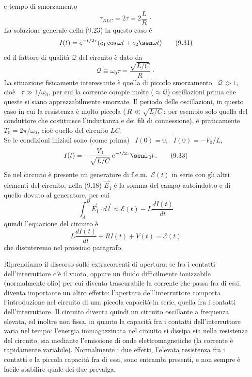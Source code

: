 e tempo di smorzamento
\begin{equation}
  \tau_{\scriptscriptstyle RLC}=2\tau=2\frac{L}{R}\,\cdot
  \tag{9.30}
\end{equation}
La soluzione generale della (9.23) in questo caso \`e
\begin{equation}
  I(t)=e^{-t/2\tau}(c_1\cos\omega t+c_2\sen\omega t)
  \tag{9.31}
\end{equation}
ed il fattore di qualit\`a $\mathcal Q$ del circuito \`e dato da
\begin{equation}
  \mathcal Q\equiv\omega_0\tau=\frac{\sqrt{L/C}}{R}\,\cdot
  \tag{9.32}
\end{equation}
La situazione fisicamente interessante \`e quella di piccolo smorzamento
\ $\mathcal Q\gg1$, cio\`e \ $\tau\gg1/\omega_0$, per cui la corrente compie
molte ($\approx\mathcal Q$) oscillazioni prima che queste si siano
apprezzabilmente smorzate. Il periodo delle oscillazioni, in questo caso in cui
la resistenza \`e molto piccola \big($\,R\ll\sqrt{L/C}$\,: per esempio solo
quella del conduttore che costituisce l'induttanza e dei fili di
connessione\big), \`e praticamente \ $T_0=2\pi/\omega_0$, cio\`e quello del
circuito $LC$.\\
Se le condizioni iniziali sono (come prima) \ $I(0)=0$, \ $\dot I(0)=-V_0/L$,
\begin{equation}
  I(t)=-\frac{V_0}{\sqrt{L/C}}\,e^{-t/2\tau}\sen\omega_0t\,.
  \tag{9.33}
\end{equation}
Se nel circuito \`e presente un generatore di f.e.m.\ $\mathcal E(t)$ in serie
con gli altri elementi del circuito, nella (9.18) $\vec E_1$ \`e la somma del
campo autoindotto e di quello dovuto al generatore, per cui
\begin{equation}
  \int_A^B\vec E_1\cdot d\vec l\approx\mathcal E(t)-L\frac{dI(t)}{dt}
  \tag{9.34}
\end{equation}
quindi l'equazione del circuito \`e
\begin{equation}
  L\frac{dI(t)}{dt}+RI(t)+V(t)=\mathcal E(t)
  \tag{9.35}
\end{equation}
che discuteremo nel prossimo paragrafo.

Riprendiamo il discorso sulle extracorrenti di apertura: se fra i contatti
dell'interruttore c'\`e il vuoto, oppure un fluido difficilmente ionizzabile
(normalmente olio) per cui diventa trascurabile la corrente che passa fra di
essi, diventa importante un altro effetto: l'apertura dell'interruttore comporta
l'introduzione nel circuito di una piccola capacit\`a in serie, quella fra i
contatti dell'interruttore. Il circuito diventa quindi un circuito oscillante a
frequenza elevata, ed inoltre non fissa, in quanto la capacit\`a fra i contatti
dell'interruttore varia nel tempo: l'energia immagazzinata nel circuito si
dissipa sia nella resistenza del circuito, sia mediante l'emissione di onde
elettromagnetiche (la corrente \`e rapidamente variabile). Normalmente i due
effetti, l'elevata resistenza fra i contatti e la piccola capacit\`a fra di
essi, sono entrambi presenti, e non sempre \`e facile stabilire quale dei due
prevalga.


